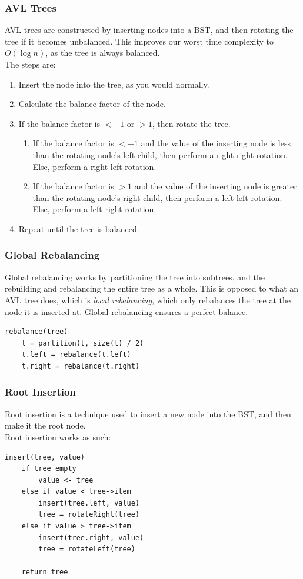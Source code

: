 \documentclass[14]{article}
\begin{document}
\subsubsection{AVL Trees}
AVL trees are constructed by inserting nodes into a BST, and then rotating the tree if it becomes unbalanced.
This improves our worst time complexity to $O(\log n)$, as the tree is always balanced. \\ 
The steps are: 
\begin{enumerate}
	\item Insert the node into the tree, as you would normally.
	\item Calculate the balance factor of the node.
	\item If the balance factor is $<-1$ or $>1$, then rotate the tree.
		\begin{enumerate}
			\item If the balance factor is $<-1$ and the value of the inserting node is less 
			than the rotating node's left child, then perform a right-right rotation.
			Else, perform a right-left rotation.
			\item If the balance factor is $>1$ and the value of the inserting node is greater
			than the rotating node's right child, then perform a left-left rotation.
			Else, perform a left-right rotation.

		\end{enumerate}
	\item Repeat until the tree is balanced.
\end{enumerate}

\subsubsection{Global Rebalancing}
Global rebalancing works by partitioning the tree into subtrees, and the rebuilding and rebalancing the entire tree
as a whole. This is opposed to what an AVL tree does, which is \emph{local rebalancing}, which only rebalances the tree
at the node it is inserted at. Global rebalancing ensures a perfect balance.
\begin{verbatim}
rebalance(tree)
    t = partition(t, size(t) / 2)
    t.left = rebalance(t.left)
    t.right = rebalance(t.right)
\end{verbatim}
\subsubsection{Root Insertion}
Root insertion is a technique used to insert a new node into the BST, and then make it the root node. \\
Root insertion works as such:
\begin{verbatim}
insert(tree, value)
    if tree empty 
        value <- tree
    else if value < tree->item
        insert(tree.left, value)
        tree = rotateRight(tree)
    else if value > tree->item
        insert(tree.right, value)
        tree = rotateLeft(tree)

    return tree
\end{verbatim}
\end{document}
